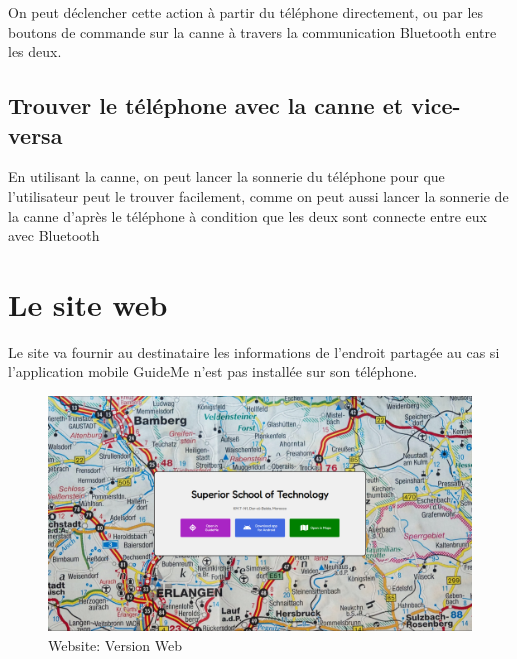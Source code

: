 \FloatBarrier

On peut déclencher cette action à partir du téléphone directement, ou par les boutons de commande sur la canne à travers la communication Bluetooth entre les deux.

\subsection{Trouver le téléphone avec la canne et vice-versa}

En utilisant la canne, on peut lancer la sonnerie du téléphone pour que l'utilisateur peut le trouver facilement, comme on peut aussi lancer la sonnerie de la canne d'après le téléphone à condition que les deux sont connecte entre eux avec Bluetooth

\section{Le site web}
\label{website}

Le site va fournir au destinataire les informations de l'endroit partagée au cas si l'application mobile GuideMe n'est pas installée sur son téléphone.



\begin{figure}[!htbp]
    \centering
    \includegraphics[width=\textwidth]{assets/website/web.png}
    \caption{Website: Version Web}
\end{figure}

